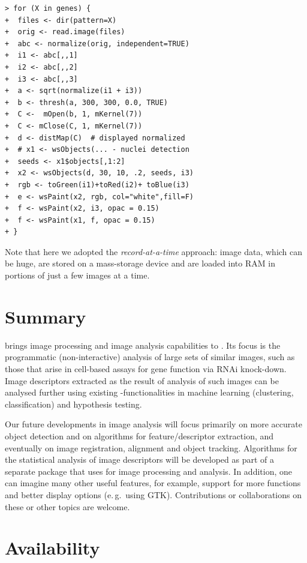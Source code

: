 \begin{verbatim}
> for (X in genes) {
+  files <- dir(pattern=X)
+  orig <- read.image(files)
+  abc <- normalize(orig, independent=TRUE)
+  i1 <- abc[,,1]
+  i2 <- abc[,,2]
+  i3 <- abc[,,3]
+  a <- sqrt(normalize(i1 + i3))
+  b <- thresh(a, 300, 300, 0.0, TRUE)
+  C <-  mOpen(b, 1, mKernel(7))
+  C <- mClose(C, 1, mKernel(7))
+  d <- distMap(C)  # displayed normalized
+  # x1 <- wsObjects(... - nuclei detection
+  seeds <- x1$objects[,1:2]
+  x2 <- wsObjects(d, 30, 10, .2, seeds, i3)
+  rgb <- toGreen(i1)+toRed(i2)+ toBlue(i3)
+  e <- wsPaint(x2, rgb, col="white",fill=F)
+  f <- wsPaint(x2, i3, opac = 0.15)
+  f <- wsPaint(x1, f, opac = 0.15)
+ }
\end{verbatim}

Note that here we adopted the \emph{record-at-a-time} approach: image data, which can be huge, are stored on a mass-storage device and are loaded into RAM in portions of just a few images at a time.

\section*{Summary}

 brings image processing and image analysis capabilities to \R. Its focus is the programmatic (non-interactive) analysis of large sets of similar images, such as those that arise in cell-based assays for gene function via RNAi knock-down. Image descriptors extracted as the result of analysis of such images can be analysed further using existing \R{}-functionalities in machine learning (clustering, classification) and hypothesis testing.

Our future developments in image analysis will focus primarily on more accurate object detection and on algorithms for feature/descriptor extraction, and eventually on image registration, alignment and object tracking. Algorithms for the statistical analysis of image descriptors will be developed as part of a separate package that uses  for image processing and analysis. In addition, one can imagine many other useful features, for example, support for more  functions and better display options (e.\,g.\ using GTK). Contributions or collaborations on these or other topics are welcome.

\section*{Availability}

